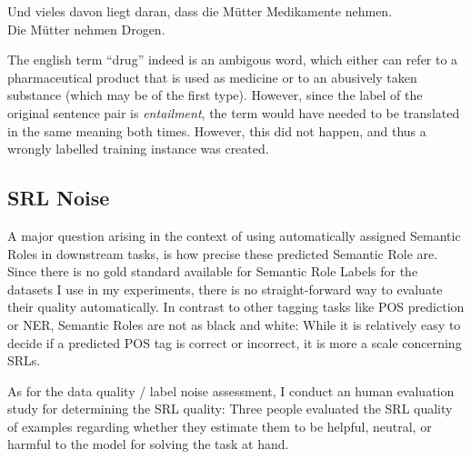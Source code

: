{\begin{examples}
  \item Und vieles davon liegt daran, dass die Mütter Medikamente nehmen.\\
        Die Mütter nehmen Drogen.
\end{examples}

The english term ``drug'' indeed is an ambigous word, which either can refer to a pharmaceutical
product that is used as medicine or to an abusively taken substance (which may be of the first
type). However, since
the label of the original sentence pair is \emph{entailment}, the term would have needed
to be translated in the same meaning both times. However, this did not happen, and thus
a wrongly labelled training instance was created.



\subsection{SRL Noise}
\label{sec:srl-noise}

A major question arising in the context of using automatically assigned Semantic Roles in
downstream tasks, is how precise these predicted Semantic Role are. Since there is no gold standard
available for Semantic Role Labels for the datasets I use in my experiments, there is no
straight-forward way to evaluate their quality {\color{red} automatically}. In contrast to
other tagging tasks like POS prediction or NER, Semantic Roles are not as black and white:
While it is relatively easy to decide if a predicted POS tag is correct or incorrect, it
{\color{red} is more a scale} concerning SRLs.

As for the data quality / label noise assessment, I conduct an human evaluation study
for determining the SRL quality: Three people evaluated the SRL quality of examples regarding
whether they estimate them to be helpful, neutral, or harmful to the model for solving
the task at hand.


}
